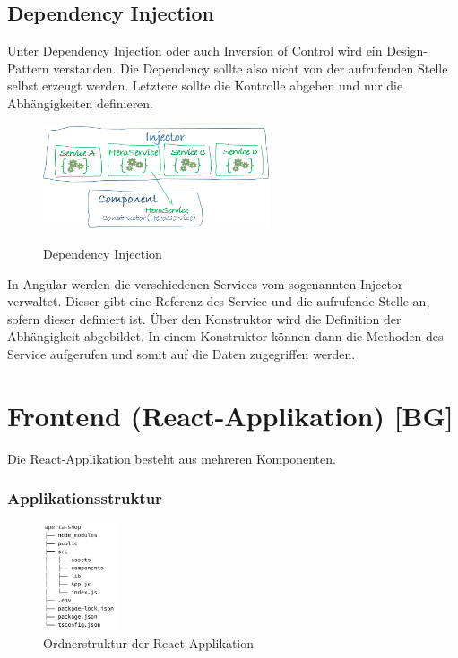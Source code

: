 \subsection{Dependency Injection}
Unter Dependency Injection oder auch Inversion of Control wird ein Design-Pattern verstanden. Die Dependency sollte also nicht von der aufrufenden Stelle selbst erzeugt werden. Letztere sollte die Kontrolle abgeben und nur die Abhängigkeiten definieren.

\begin{figure}[H]
  \centering
  \includegraphics[width=0.6\textwidth]{./pics/DependencyInjection.png}
  \caption{Dependency Injection}
\cite{DependencyInjection}
\end{figure}
In Angular werden die verschiedenen Services vom sogenannten Injector verwaltet. Dieser gibt eine Referenz des Service und die aufrufende Stelle an, sofern dieser definiert ist. Über den Konstruktor wird die Definition der Abhängigkeit abgebildet. In einem Konstruktor können dann die Methoden des Service aufgerufen und somit auf die Daten zugegriffen werden.
\cite{AngularService}

\section{Frontend (React-Applikation) [BG]}
Die React-Applikation besteht aus mehreren Komponenten.

\subsubsection{Applikationsstruktur}

\begin{figure}[H]
  \centering
  \includegraphics[width=0.2\textwidth]{pics/react-ordnerstruktur.png}
  \caption{Ordnerstruktur der React-Applikation}
\end{figure}

